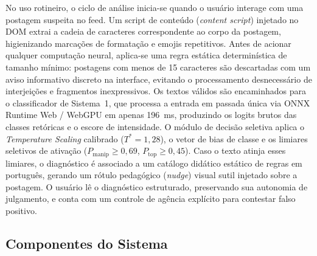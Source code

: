 \documentclass[runningheads]{llncs}
\begin{document}
No uso rotineiro, o ciclo de análise inicia-se quando o usuário interage com uma postagem suspeita no feed. Um script de conteúdo (\textit{content script}) injetado no DOM extrai a cadeia de caracteres correspondente ao corpo da postagem, higienizando marcações de formatação e emojis repetitivos. Antes de acionar qualquer computação neural, aplica-se uma regra estática determinística de tamanho mínimo: postagens com menos de 15 caracteres são descartadas com um aviso informativo discreto na interface, evitando o processamento desnecessário de interjeições e fragmentos inexpressivos. Os textos válidos são encaminhados para o classificador de Sistema~1, que processa a entrada em passada única via ONNX Runtime Web / WebGPU em apenas 196~ms, produzindo os logits brutos das classes retóricas e o escore de intensidade. O módulo de decisão seletiva aplica o \textit{Temperature Scaling} calibrado ($T^* = 1{,}28$), o vetor de bias de classe e os limiares seletivos de ativação ($P_{\text{manip}} \ge 0{,}69$, $P_{\text{top}} \ge 0{,}45$). Caso o texto atinja esses limiares, o diagnóstico é associado a um catálogo didático estático de regras em português, gerando um rótulo pedagógico (\textit{nudge}) visual sutil injetado sobre a postagem. O usuário lê o diagnóstico estruturado, preservando sua autonomia de julgamento, e conta com um controle de agência explícito para contestar falso positivo.

\subsection{Componentes do Sistema}
\end{document}
